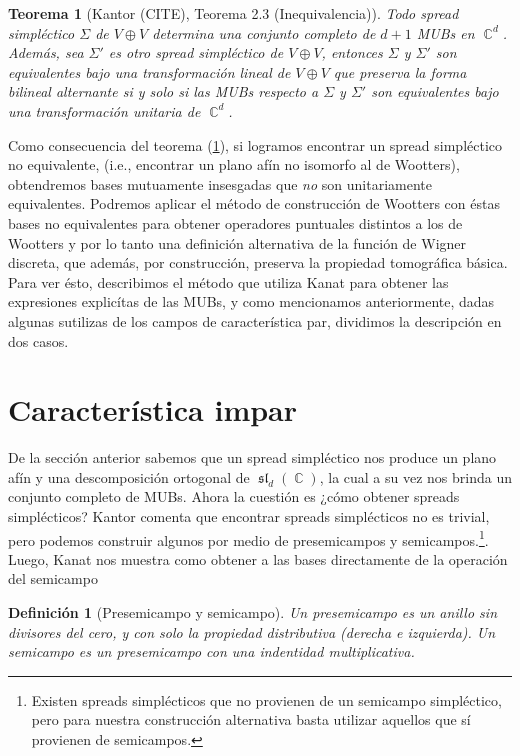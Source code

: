 \documentclass[a4paper]{report}
\DeclareMathOperator{\C}{\mathbb{C}}
\DeclareMathOperator{\Sl}{\mathfrak{sl}}
\newtheorem{definition}{Definición}
\newtheorem{theorem}{Teorema}
\begin{document}
  \begin{theorem}[Kantor (CITE), Teorema 2.3
    (Inequivalencia)]
    \label{thm:kantor_ineq}
    Todo spread simpléctico $\Sigma$ de $V \oplus V$
    determina una conjunto completo de $d+1$ MUBs en
    $\C^{d}$. Además, sea $\Sigma'$ es otro spread
    simpléctico de $V \oplus V$, entonces $\Sigma$ y
    $\Sigma'$ son equivalentes bajo una transformación
    lineal de $V \oplus V$ que preserva la forma bilineal
    alternante si y solo si las MUBs respecto a  $\Sigma$ y
    $\Sigma'$ son equivalentes bajo una transformación
    unitaria de $\C^{d}$.
  \end{theorem}

  Como consecuencia del teorema (\ref{thm:kantor_ineq}), si
  logramos encontrar un spread simpléctico no equivalente,
  (i.e., encontrar un plano afín no isomorfo al de
  Wootters), obtendremos bases mutuamente insesgadas que
  \textit{no} son unitariamente equivalentes. Podremos
  aplicar el método de construcción de Wootters con éstas
  bases no equivalentes para obtener operadores puntuales
  distintos a los de Wootters y por lo tanto una definición
  alternativa de la función de Wigner discreta, que además,
  por construcción, preserva la propiedad tomográfica
  básica. Para ver ésto, describimos el método que utiliza
  Kanat para obtener las expresiones explicítas de las
  MUBs, y como mencionamos anteriormente, dadas algunas
  sutilizas de los campos de característica par, dividimos
  la descripción en dos casos.
  
  \section{Característica impar}

  De la sección anterior sabemos que un spread simpléctico
  nos produce un plano afín y una descomposición ortogonal
  de $\Sl_d(\C)$, la cual a su vez nos brinda un conjunto
  completo de MUBs. Ahora la cuestión es ¿cómo obtener
  spreads simplécticos? Kantor comenta que encontrar spreads
  simplécticos no es trivial, pero podemos construir algunos
  por medio de presemicampos y semicampos.\footnote{Existen
  spreads simplécticos que no provienen de un semicampo
  simpléctico, pero para nuestra construcción alternativa
  basta utilizar aquellos que sí provienen de
  semicampos.}. Luego, Kanat nos muestra como obtener a las
  bases directamente de la operación del semicampo

  \begin{definition}[Presemicampo y semicampo]
    \label{def:presemifield}
    Un presemicampo es un anillo sin divisores del cero, y
    con solo la propiedad distributiva (derecha e
    izquierda). Un semicampo es un presemicampo con una
    indentidad multiplicativa.
  \end{definition}
\end{document}
